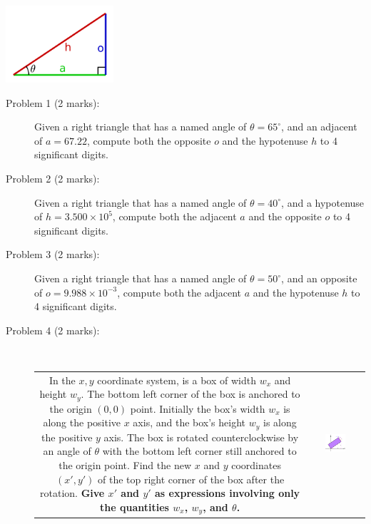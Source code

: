 \documentclass{article}
\begin{document}
\includegraphics[width = 0.3\textwidth]{right_triangle_v2}

\begin{description}
\item[Problem 1 (2 marks):] Given a right triangle that has a named angle of \(\theta = 65^\circ\), and an adjacent of \(a = 67.22\), compute both the opposite \(o\) and the hypotenuse \(h\) to 4 significant digits.
\item[Problem 2 (2 marks):] Given a right triangle that has a named angle of \(\theta = 40^\circ\), and a hypotenuse of \(h = 3.500 \times 10^5\), compute both the adjacent \(a\) and the opposite \(o\) to 4 significant digits. 
\item[Problem 3 (2 marks):] Given a right triangle that has a named angle of \(\theta = 50^\circ\), and an opposite of \(o = 9.988 \times 10^{-3}\), compute both the adjacent \(a\) and the hypotenuse \(h\) to 4 significant digits.    
\item[Problem 4 (2 marks):] ~~~~ \\   
\begin{tabular}{cc}
\parbox{0.5\textwidth}{
In the \(x,y\) coordinate system, is a box of width \(w_x\) and height \(w_y\). The bottom left corner of the box is anchored to the origin \((0,0)\) point. Initially the box's width \(w_x\) is along the positive \(x\) axis, and the box's height \(w_y\) is along the positive \(y\) axis. The box is rotated counterclockwise by an angle of \(\theta\) with the bottom left corner still anchored to the origin point. Find the new \(x\) and \(y\) coordinates \((x',y')\) of the top right corner of the box after the rotation. {\bf Give \(x'\) and \(y'\) as expressions involving only the quantities \(w_x\), \(w_y\), and \(\theta\).} 
} & \parbox{0.4\textwidth}{
\includegraphics[width = 0.4\textwidth]{tilted_box}
}
\end{tabular}
\end{description}
\end{document}

